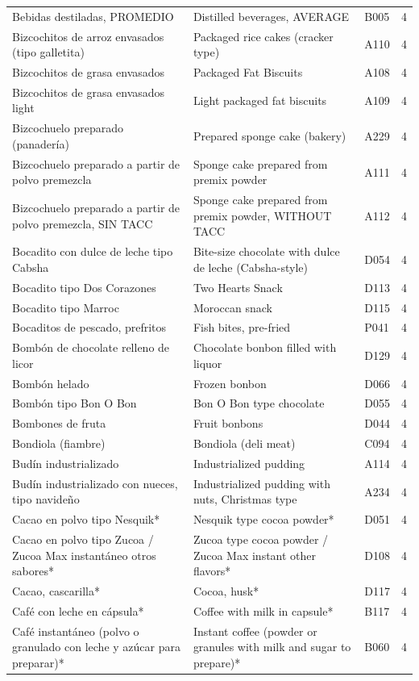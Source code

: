 {\begin{longtable}{p{4.3cm}p{5.5cm}p{1.5cm}p{0.7cm}}
Bebidas destiladas, PROMEDIO & Distilled beverages, AVERAGE & B005 & 4\\
Bizcochitos de arroz envasados (tipo galletita) & Packaged rice cakes (cracker type) & A110 & 4\\
Bizcochitos de grasa envasados & Packaged Fat Biscuits & A108 & 4\\
Bizcochitos de grasa envasados light & Light packaged fat biscuits & A109 & 4\\
Bizcochuelo preparado (panadería) & Prepared sponge cake (bakery) & A229 & 4\\
Bizcochuelo preparado a partir de polvo premezcla & Sponge cake prepared from premix powder & A111 & 4\\
Bizcochuelo preparado a partir de polvo premezcla, SIN TACC & Sponge cake prepared from premix powder, WITHOUT TACC & A112 & 4\\
Bocadito con dulce de leche tipo Cabsha & Bite-size chocolate with dulce de leche (Cabsha-style) & D054 & 4\\
Bocadito tipo Dos Corazones & Two Hearts Snack & D113 & 4\\
Bocadito tipo Marroc & Moroccan snack & D115 & 4\\
Bocaditos de pescado, prefritos & Fish bites, pre-fried & P041 & 4\\
Bombón de chocolate relleno de licor & Chocolate bonbon filled with liquor & D129 & 4\\
Bombón helado & Frozen bonbon & D066 & 4\\
Bombón tipo Bon O Bon & Bon O Bon type chocolate & D055 & 4\\
Bombones de fruta & Fruit bonbons & D044 & 4\\
Bondiola (fiambre) & Bondiola (deli meat) & C094 & 4\\
Budín industrializado & Industrialized pudding & A114 & 4\\
Budín industrializado con nueces, tipo navideño & Industrialized pudding with nuts, Christmas type & A234 & 4\\
Cacao en polvo tipo Nesquik* & Nesquik type cocoa powder* & D051 & 4\\
Cacao en polvo tipo Zucoa / Zucoa Max instantáneo otros sabores* & Zucoa type cocoa powder / Zucoa Max instant other flavors* & D108 & 4\\
Cacao, cascarilla* & Cocoa, husk* & D117 & 4\\
Café con leche en cápsula* & Coffee with milk in capsule* & B117 & 4\\
Café instantáneo (polvo o granulado con leche y azúcar para preparar)* & Instant coffee (powder or granules with milk and sugar to prepare)* & B060 & 4\\

\end{longtable}}
